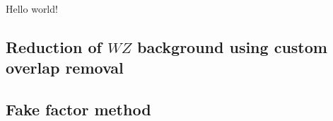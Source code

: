 Hello world!

\subsection{Reduction of $WZ$ background using custom overlap removal}\label{ssww13tev:custom_or}


\subsection{Fake factor method}\label{ssww13tev:fakefactor}

